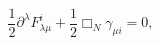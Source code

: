 \begin{equation}
  \frac{1}{2} \partial^\lambda F_{\lambda \mu}^i+\frac{1}{2} 
\Box_N \gamma_{\mu i}=0,
\end{equation}

